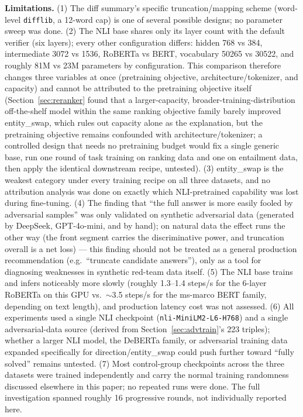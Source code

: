 \documentclass[11pt]{article}
\begin{document}
\textbf{Limitations.} (1) The diff summary's specific truncation/mapping scheme (word-level \texttt{difflib}, a 12-word cap) is one of several possible designs; no parameter sweep was done. (2) The NLI base shares only its layer count with the default verifier (six layers); every other configuration differs: hidden 768 vs 384, intermediate 3072 vs 1536, RoBERTa vs BERT, vocabulary 50265 vs 30522, and roughly 81M vs 23M parameters by configuration. This comparison therefore changes three variables at once (pretraining objective, architecture/tokenizer, and capacity) and cannot be attributed to the pretraining objective itself (Section~\ref{sec:reranker} found that a larger-capacity, broader-training-distribution off-the-shelf model within the same ranking objective family barely improved entity\_swap, which rules out capacity alone as the explanation, but the pretraining objective remains confounded with architecture/tokenizer; a controlled design that needs no pretraining budget would fix a single generic base, run one round of task training on ranking data and one on entailment data, then apply the identical downstream recipe, untested). (3) entity\_swap is the weakest category under every training recipe on all three datasets, and no attribution analysis was done on exactly which NLI-pretrained capability was lost during fine-tuning. (4) The finding that ``the full answer is more easily fooled by adversarial samples'' was only validated on synthetic adversarial data (generated by DeepSeek, GPT-4o-mini, and by hand); on natural data the effect runs the other way (the front segment carries the discriminative power, and truncation overall is a net loss) --- this finding should not be treated as a general production recommendation (e.g.\ ``truncate candidate answers''), only as a tool for diagnosing weaknesses in synthetic red-team data itself. (5) The NLI base trains and infers noticeably more slowly (roughly 1.3--1.4 steps/s for the 6-layer RoBERTa on this GPU vs.\ $\sim$3.5 steps/s for the ms-marco BERT family, depending on text length), and production latency cost was not assessed. (6) All experiments used a single NLI checkpoint (\texttt{nli-Mini\allowbreak{}LM2-L6-H768}) and a single adversarial-data source (derived from Section~\ref{sec:advtrain}'s 223 triples); whether a larger NLI model, the DeBERTa family, or adversarial training data expanded specifically for direction/entity\_swap could push further toward ``fully solved'' remains untested. (7) Most control-group checkpoints across the three datasets were trained independently and carry the normal training randomness discussed elsewhere in this paper; no repeated runs were done. The full investigation spanned roughly 16 progressive rounds, not individually reported here.
\end{document}
